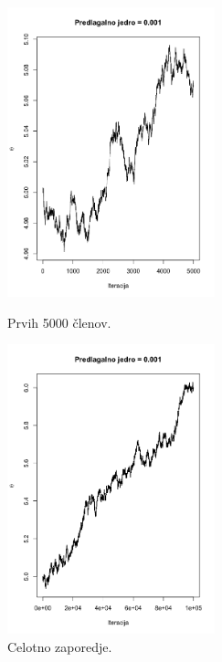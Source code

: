 \documentclass[a4paper,11pt]{article}
\begin{document}
    \begin{figure}[ht!]
        \begin{minipage}{0.5\textwidth}
            \centering
            \includegraphics[width = 60mm]{Slike/4_1b_S.png}
            \caption{Prvih 5000 členov.}
        \end{minipage}
        \begin{minipage}{0.5\textwidth}
            \centering
            \includegraphics[width = 60mm]{Slike/4_1b_celotno.png}
            \caption{Celotno zaporedje.}
        \end{minipage}
    \end{figure}
\newpage
\end{document}
